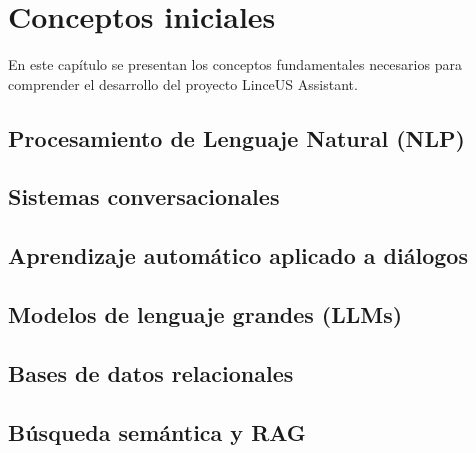 
\chapter{Conceptos iniciales}\label{cap:conceptos}

En este capítulo se presentan los conceptos fundamentales necesarios para comprender el desarrollo del proyecto LinceUS Assistant.

\section{Procesamiento de Lenguaje Natural (NLP)}\label{sec:nlp}


\section{Sistemas conversacionales}\label{sec:sistemas-conversacionales}


\section{Aprendizaje automático aplicado a diálogos}\label{sec:ml-dialogos}


\section{Modelos de lenguaje grandes (LLMs)}\label{sec:llms}


\section{Bases de datos relacionales}\label{sec:bd-relacionales}


\section{Búsqueda semántica y RAG}\label{sec:busqueda-semantica}

